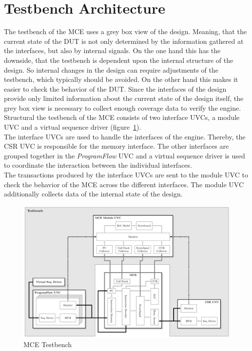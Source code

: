 \section{Testbench Architecture}

The testbench of the MCE uses a grey box view of the design.
Meaning, that the current state of the DUT is not only determined by the information gathered at the interfaces, but also by internal signals.
On the one hand this has the downside, that the testbench is dependent upon the internal structure of the design.
So internal changes in the design can require adjustments of the testbench, which typically should be avoided.
On the other hand this makes it easier to check the behavior of the DUT.
Since the interfaces of the design provide only limited information about the current state of the design itself, the grey box view is necessary to collect enough coverage data to verify the engine.\\ 
Structural the testbench of the MCE consists of two interface UVCs, a module UVC and a virtual sequence driver (figure~\ref{fig:mce_tb}).\\
The interface UVCs are used to handle the interfaces of the engine.
Thereby, the CSR UVC is responsible for the memory interface.
The other interfaces are grouped together in the \emph{ProgramFlow} UVC and a virtual sequence driver is used to coordinate the interaction between the individual interfaces.\\
The transactions produced by the interface UVCs are sent to the module UVC to check the behavior of the MCE across the different interfaces.
The module UVC additionally collects data of the internal state of the design.



\begin{figure}[htb]
 \centering
 \includegraphics[width=1.0\textwidth,angle=0]{images/mce_tb}
 \caption{MCE Testbench}
\label{fig:mce_tb}
\end{figure}

